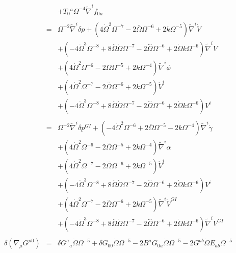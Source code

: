\begin{eqnarray}
&&+ T_{0}{}^{a} \Omega^{-4} \tilde{\nabla}^{i}f_{0}{}_{a}
\\  \nonumber\\ 
&=& \Omega^{-2} \tilde{\nabla}^{i}\delta p + (4 \dot{\Omega}^2 \Omega^{-7} - 2 \overset{..}{\Omega} \Omega^{-6} + 2 k \Omega^{-5}) \tilde{\nabla}^{i}\dot{V} \nonumber \\ 
&& + (-4 \dot{\Omega}^3 \Omega^{-8} + 8 \overset{..}{\Omega} \dot{\Omega} \Omega^{-7} - 2 \overset{...}{\Omega} \Omega^{-6} + 2 \dot{\Omega} k \Omega^{-6}) \tilde{\nabla}^{i}V \nonumber \\ 
&& + (4 \dot{\Omega}^2 \Omega^{-6} - 2 \overset{..}{\Omega} \Omega^{-5} + 2 k \Omega^{-4}) \tilde{\nabla}^{i}\phi 
\nonumber\\
&&+(4 \dot{\Omega}^2 \Omega^{-7} - 2 \overset{..}{\Omega} \Omega^{-6} + 2 k \Omega^{-5}) \dot{V}^{i} \nonumber \\ 
&& + (-4 \dot{\Omega}^3 \Omega^{-8} + 8 \overset{..}{\Omega} \dot{\Omega} \Omega^{-7} - 2 \overset{...}{\Omega} \Omega^{-6} + 2 \dot{\Omega} k \Omega^{-6}) V^{i}
\\  \nonumber\\ 
&=& \Omega^{-2} \tilde{\nabla}^{i}\delta p^{GI}{} + (-4 \dot{\Omega}^2 \Omega^{-6} + 2 \overset{..}{\Omega} \Omega^{-5} - 2 k \Omega^{-4}) \tilde{\nabla}^{i}\dot{\gamma} \nonumber \\ 
&& + (4 \dot{\Omega}^2 \Omega^{-6} - 2 \overset{..}{\Omega} \Omega^{-5} + 2 k \Omega^{-4}) \tilde{\nabla}^{i}\alpha 
\nonumber\\
&&+(4 \dot{\Omega}^2 \Omega^{-7} - 2 \overset{..}{\Omega} \Omega^{-6} + 2 k \Omega^{-5}) \dot{V}^{i} \nonumber \\ 
&& + (-4 \dot{\Omega}^3 \Omega^{-8} + 8 \overset{..}{\Omega} \dot{\Omega} \Omega^{-7} - 2 \overset{...}{\Omega} \Omega^{-6} + 2 \dot{\Omega} k \Omega^{-6}) V^{i} 
\nonumber\\
&&+ (4 \dot{\Omega}^2 \Omega^{-7} - 2 \overset{..}{\Omega} \Omega^{-6} + 2 k \Omega^{-5}) \tilde{\nabla}^{i}\dot{V}^{GI}{} \nonumber \\ 
&& + (-4 \dot{\Omega}^3 \Omega^{-8} + 8 \overset{..}{\Omega} \dot{\Omega} \Omega^{-7} - 2 \overset{...}{\Omega} \Omega^{-6} + 2 \dot{\Omega} k \Omega^{-6}) \tilde{\nabla}^{i}V^{GI}{}
\\ \nonumber\\
\delta(\nabla_\mu G^{\mu 0})&=& \delta G^{a}{}_{a} \dot{\Omega} \Omega^{-5} + \delta G_{00}{} \dot{\Omega} \Omega^{-5} - 2 B^{a} G_{0}{}_{a} \dot{\Omega} \Omega^{-5} - 2 G^{ab} \dot{\Omega} E_{ab} \Omega^{-5} 

\end{eqnarray}
